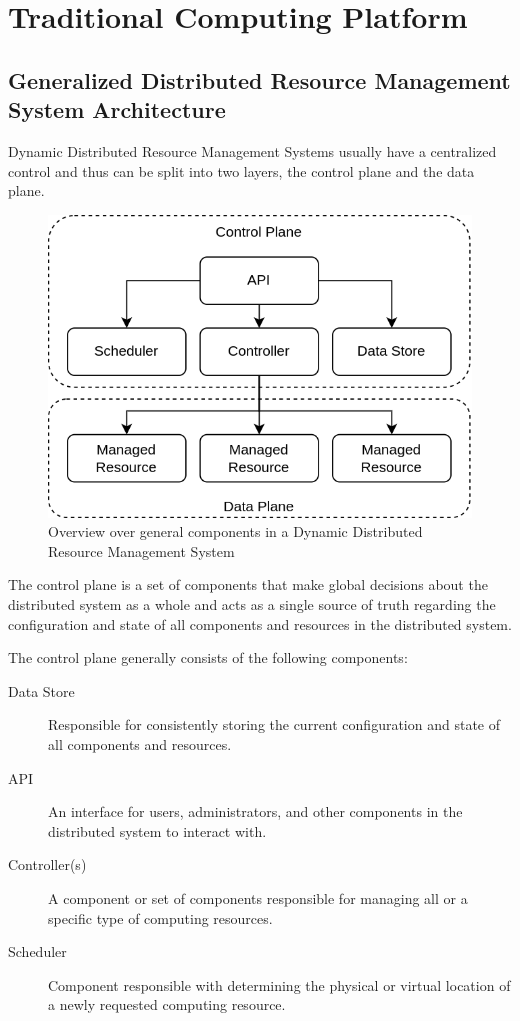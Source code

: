 \section{Traditional Computing Platform}

\subsection{Generalized Distributed Resource Management System Architecture}

Dynamic Distributed Resource Management Systems usually have a centralized
control and thus can be split into two layers, the control plane and the data
plane.

\begin{figure}[h!]
  \centering
  \includegraphics[width=0.6\linewidth]{resources/dynamic-distributed-resource-management-overview.png}
  \caption{Overview over general components in a Dynamic Distributed Resource Management System}
  \label{fig:ddrms-overview}
\end{figure}

The control plane is a set of components that make global decisions about the
distributed system as a whole and acts as a single source of truth regarding the
configuration and state of all components and resources in the distributed
system.

The control plane generally consists of the following components:

\begin{description}
  \item[Data Store]
    Responsible for consistently storing the current configuration and state of
    all components and resources.
  \item[API]
    An interface for users, administrators, and other components in the
    distributed system to interact with.
  \item[Controller(s)]
    A component or set of components responsible for managing all or a specific
    type of computing resources.
  \item[Scheduler]
    Component responsible with determining the physical or virtual location of a
    newly requested computing resource.
\end{description}

